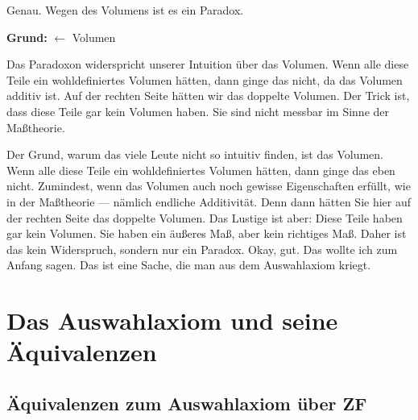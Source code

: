 \begin{spoken-clean}[continued]
Genau. Wegen des Volumens ist es ein Paradox.
\end{spoken-clean}

\begin{math-stroke}
\textbf{Grund:} $\leftarrow$ Volumen

\begin{explanation-of-steps}
Das Paradoxon widerspricht unserer Intuition über das Volumen. Wenn alle diese Teile ein wohldefiniertes Volumen hätten, dann ginge das nicht, da das Volumen additiv ist. Auf der rechten Seite hätten wir das doppelte Volumen. Der Trick ist, dass diese Teile gar kein Volumen haben. Sie sind nicht messbar im Sinne der Maßtheorie.
\end{explanation-of-steps}
\end{math-stroke}

\begin{spoken-clean}[00:06:52 - 00:07:30]
Der Grund, warum das viele Leute nicht so intuitiv finden, ist das Volumen. Wenn alle diese Teile ein wohldefiniertes Volumen hätten, dann ginge das eben nicht. Zumindest, wenn das Volumen auch noch gewisse Eigenschaften erfüllt, wie in der Maßtheorie --- nämlich endliche Additivität. Denn dann hätten Sie hier auf der rechten Seite das doppelte Volumen. Das Lustige ist aber: Diese Teile haben gar kein Volumen. Sie haben ein äußeres Maß, aber kein richtiges Maß. Daher ist das kein Widerspruch, sondern nur ein Paradox. Okay, gut. Das wollte ich zum Anfang sagen. Das ist eine Sache, die man aus dem Auswahlaxiom kriegt.
\end{spoken-clean}

\section{Das Auswahlaxiom und seine Äquivalenzen}

\subsection{Äquivalenzen zum Auswahlaxiom über ZF}

